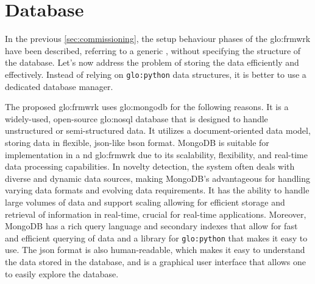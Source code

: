 
\section{Database}
\label{sec:Database}
In the previous \autoref{sec:commissioning}, the setup behaviour phases of the \gls{glo:frmwrk} have been described, referring to a generic , without specifying the structure of the database. Let's now address the problem of storing the data efficiently and effectively. Instead of relying on \texttt{\gls{glo:python}} data structures, it is better to use a dedicated database manager.

The proposed \gls{glo:frmwrk} uses \gls{glo:mongodb} for the following reasons. It is a widely-used, open-source \gls{glo:nosql} database that is designed to handle unstructured or semi-structured data. It utilizes a document-oriented data model, storing data in flexible, \gls{json}-like \gls{bson} format. MongoDB is suitable for implementation in a \gls{nd} \gls{glo:frmwrk} due to its scalability, flexibility, and real-time data processing capabilities. In novelty detection, the system often deals with diverse and dynamic data sources, making MongoDB's  advantageous for handling varying data formats and evolving data requirements. It has the ability to handle large volumes of data and support scaling allowing for efficient storage and retrieval of information in real-time, crucial for real-time applications. Moreover, MongoDB has a rich query language and secondary indexes that allow for fast and efficient querying of data and a library for \texttt{\gls{glo:python}} that makes it easy to use.
The \gls{json} format is also human-readable, which makes it easy to understand the data stored in the database, and  is a graphical user interface that allows one to easily explore the database.

